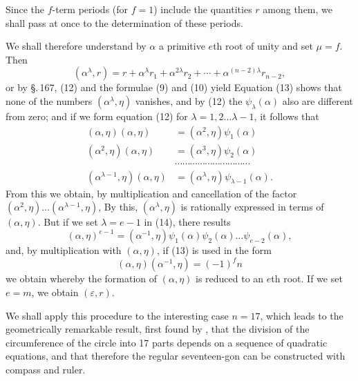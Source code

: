 Since the $f$-term periods (for $f = 1$) include the quantities $r$
among them, we shall pass at once to the determination of these
periods.

We shall therefore understand by $\alpha$ a primitive $e$th root of unity
and set $\mu = f$.
Then
\[ (\alpha^\lambda, r) = r + \alpha^\lambda r_1 + \alpha^{2\lambda} r_2 + \cdots + \alpha^{(n-2)\lambda} r_{n-2}, \]
or by \S.\,167, (12)
and the formulae (9) and (10) yield
Equation (13) shows that none of the numbers $(\alpha^\lambda, \eta)$ vanishes,
and by (12) the $\psi_\lambda(\alpha)$ also are different from zero;
and if we form equation (12) for $\lambda = 1, 2 \ldots \lambda - 1$,
it follows that
\[
\begin{aligned}
(\alpha, \eta)(\alpha, \eta) &= (\alpha^2, \eta)\psi_1(\alpha)\\
(\alpha^2, \eta)(\alpha, \eta) &= (\alpha^3, \eta)\psi_2(\alpha)\\
&\cdots\cdots\cdots\cdots\cdots\cdots\cdots\cdots\cdots\cdots\\
(\alpha^{\lambda-1}, \eta)(\alpha, \eta) &= (\alpha^\lambda, \eta)\psi_{\lambda-1}(\alpha).
\end{aligned}
\]
From this we obtain, by multiplication and cancellation
of the factor $(\alpha^2, \eta) \ldots (\alpha^{\lambda-1}, \eta)$,
By this, $(\alpha^\lambda, \eta)$ is rationally expressed in terms of $(\alpha, \eta)$. But if
we set $\lambda = e - 1$ in (14), there results
\[ (\alpha, \eta)^{e-1} = (\alpha^{-1}, \eta)\psi_1(\alpha)\psi_2(\alpha) \ldots \psi_{e-2}(\alpha), \]
and, by multiplication with $(\alpha, \eta)$, if (13) is used in the form
\[ (\alpha, \eta)(\alpha^{-1}, \eta) = (-1)^f n \]
we obtain
whereby the formation of $(\alpha, \eta)$ is reduced to an $e$th
root. If we set $e = m$, we obtain $(\varepsilon, r)$.

We shall apply this procedure to the interesting case $n = 17$,
which leads to the geometrically remarkable result, first found by
, that the division of the circumference of the circle
into 17 parts depends on a sequence of quadratic equations,
and that therefore the regular seventeen-gon can be
constructed with compass and ruler.
